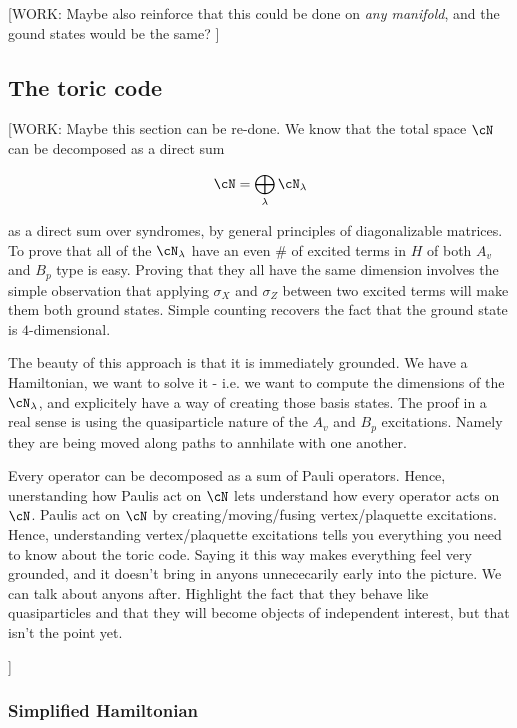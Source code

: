 [WORK: Maybe also reinforce that this could be done on \textit{any manifold}, and the gound states would be the same? ]

\subsection{The toric code}

[WORK: Maybe this section can be re-done. We know that the total space $\cN$ can be decomposed as a direct sum

$$\cN=\bigoplus_{\lambda}\cN_\lambda$$

as a direct sum over syndromes, by general principles of diagonalizable matrices. To prove that all of the $\cN_\lambda$  have an even $\#$ of excited terms in $H$ of both $A_v$ and $B_p$ type is easy. Proving that they all have the same dimension involves the simple observation that applying $\sigma_X$ and $\sigma_Z$ between two excited terms will make them both ground states. Simple counting recovers the fact that the ground state is $4$-dimensional.

The beauty of this approach is that it is immediately grounded. We have a Hamiltonian, we want to solve it - i.e. we want to compute the dimensions of the $\cN_\lambda$, and explicitely have a way of creating those basis states. The proof in a real sense is using the quasiparticle nature of the $A_v$ and $B_p$ excitations. Namely they are being moved along paths to annhilate with one another.

Every operator can be decomposed as a sum of Pauli operators. Hence, unerstanding how Paulis act on $\cN$ lets understand how every operator acts on $\cN$. Paulis act on $\cN$ by creating/moving/fusing vertex/plaquette excitations. Hence, understanding vertex/plaquette excitations tells you everything you need to know about the toric code. Saying it this way makes everything feel very grounded, and it doesn't bring in anyons unnececarily early into the picture. We can talk about anyons after. Highlight the fact that they behave like quasiparticles and that they will become objects of independent interest, but that isn't the point yet.

]

\subsubsection{Simplified Hamiltonian}

